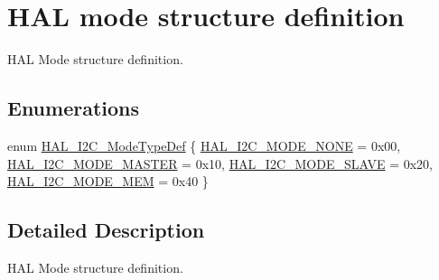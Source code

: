 \hypertarget{group___h_a_l__mode__structure__definition}{\section{H\-A\-L mode structure definition}
\label{group___h_a_l__mode__structure__definition}
}


H\-A\-L Mode structure definition.  


\subsection*{Enumerations}
\begin{DoxyCompactItemize}
\item 
enum \hyperlink{group___h_a_l__mode__structure__definition_gabcbb7b844f2ffd63c4e530c117882062}{H\-A\-L\-\_\-\-I2\-C\-\_\-\-Mode\-Type\-Def} \{ \hyperlink{group___h_a_l__mode__structure__definition_ggabcbb7b844f2ffd63c4e530c117882062a98c8fd642b7ac45a23479bd597fc7a71}{H\-A\-L\-\_\-\-I2\-C\-\_\-\-M\-O\-D\-E\-\_\-\-N\-O\-N\-E} = 0x00, 
\hyperlink{group___h_a_l__mode__structure__definition_ggabcbb7b844f2ffd63c4e530c117882062a1eea98660a170dd7b191c9dfe46da6d2}{H\-A\-L\-\_\-\-I2\-C\-\_\-\-M\-O\-D\-E\-\_\-\-M\-A\-S\-T\-E\-R} = 0x10, 
\hyperlink{group___h_a_l__mode__structure__definition_ggabcbb7b844f2ffd63c4e530c117882062a817358d19d278261f2047a5ec8ec6b53}{H\-A\-L\-\_\-\-I2\-C\-\_\-\-M\-O\-D\-E\-\_\-\-S\-L\-A\-V\-E} = 0x20, 
\hyperlink{group___h_a_l__mode__structure__definition_ggabcbb7b844f2ffd63c4e530c117882062a3f592bd942f973242aac6b7df79f3f1e}{H\-A\-L\-\_\-\-I2\-C\-\_\-\-M\-O\-D\-E\-\_\-\-M\-E\-M} = 0x40
 \}
\end{DoxyCompactItemize}


\subsection{Detailed Description}
H\-A\-L Mode structure definition. 

